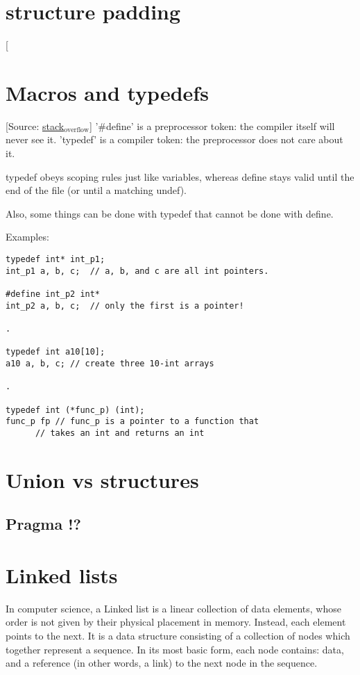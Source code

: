 \documentclass[11pt]{article}
\begin{document}
\section{structure padding}
\label{sec:org37d3115}
[

\section{Macros and typedefs}
\label{sec:org2abd068}
[Source: \href{https://stackoverflow.com/questions/1666353/are-typedef-and-define-the-same-in-c}{stack\(_{\text{overflow}}\)}]
'\#define' is a preprocessor token: the compiler itself will never see it.
'typedef' is a compiler token: the preprocessor does not care about
it.

typedef obeys scoping rules just like variables, whereas define stays valid until the end of the file (or until a matching undef).

Also, some things can be done with typedef that cannot be done with define.

Examples:

\begin{verbatim}
typedef int* int_p1;
int_p1 a, b, c;  // a, b, and c are all int pointers.

#define int_p2 int*
int_p2 a, b, c;  // only the first is a pointer!

.

typedef int a10[10];
a10 a, b, c; // create three 10-int arrays

.

typedef int (*func_p) (int);
func_p fp // func_p is a pointer to a function that
	  // takes an int and returns an int
\end{verbatim}

\section{Union vs structures}
\label{sec:org0f25b14}


\subsection{Pragma !?}
\label{sec:orgaebe6da}

\section{Linked lists}
\label{sec:org7484e1f}
In computer science, a Linked list is a linear collection of data
elements, whose order is not given by their physical placement in
memory. Instead, each element points to the next. It is a data
structure consisting of a collection of nodes which together represent
a sequence. In its most basic form, each node contains: data, and a
reference (in other words, a link) to the next node in the sequence. 
\end{document}

